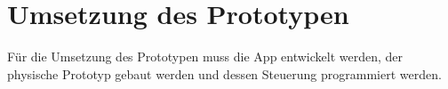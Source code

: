 \section{Umsetzung des Prototypen}
Für die Umsetzung des Prototypen muss die App entwickelt werden, der physische Prototyp gebaut werden und dessen Steuerung programmiert werden.









